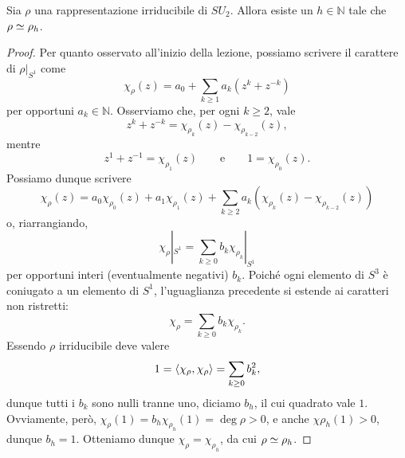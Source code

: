 \begin{proposition}
Sia $\rho$ una rappresentazione irriducibile di $SU_2$. Allora esiste un $h\in\mathbb{N}$ tale che $\rho\simeq\rho_h$.
\end{proposition}
\begin{proof}
Per quanto osservato all'inizio della lezione, possiamo scrivere il carattere di $\rho|_{S^1}$ come
$$
\chi_\rho(z)=a_0+\sum_{k\ge 1}a_k(z^k+z^{-k})
$$
per opportuni $a_k\in\mathbb{N}$. Osserviamo che, per ogni $k\ge 2$, vale 
$$
z^k+z^{-k}=\chi_{\rho_k}(z)-\chi_{\rho_{k-2}}(z),
$$
mentre
$$
z^1+z^{-1}=\chi_{\rho_1}(z)\qquad\text{e}\qquad 1=\chi_{\rho_0}(z).
$$
Possiamo dunque scrivere
$$
\chi_\rho(z)=a_0\chi_{\rho_0}(z)+a_1\chi_{\rho_1}(z)+\sum_{k\ge 2}a_k(\chi_{\rho_k}(z)-\chi_{\rho_{k-2}}(z))
$$
o, riarrangiando,
$$
\chi_\rho|_{S^1}=\sum_{k\ge 0}b_k\chi_{\rho_k}|_{S^1}
$$
per opportuni interi (eventualmente negativi) $b_k$. Poiché ogni elemento di $S^3$ è coniugato a un elemento di $S^1$, l'uguaglianza precedente si estende ai caratteri non ristretti:
$$
\chi_\rho=\sum_{k\ge 0}b_k\chi_{\rho_k}.
$$
Essendo $\rho$ irriducibile deve valere
$$
1=\left\langle\chi_\rho,\chi_\rho\right\rangle=\sum_{k\ge 0}b_k^2,
$$
dunque tutti i $b_k$ sono nulli tranne uno, diciamo $b_h$, il cui quadrato vale $1$. Ovviamente, però, $\chi_\rho(1)=b_h\chi_{\rho_h}(1)=\deg\rho>0$, e anche $\chi{\rho_h}(1)>0$, dunque $b_h=1$. Otteniamo dunque $\chi_\rho=\chi_{\rho_h}$, da cui $\rho\simeq\rho_h$.
\end{proof}
